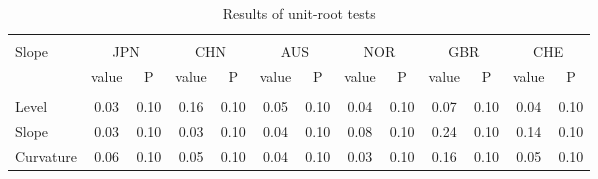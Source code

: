 \documentclass[12pt,bibliography=totoc]{article}
\begin{document}
\begin{appendices}
\begin{table}
\begin{subtable}[t]{1\textwidth}
\begin{tabular}{l cc cc cc cc cc cc}
\hline   \\ [-1.5ex]    

Slope	&	\multicolumn{2}{c}{JPN}			&	\multicolumn{2}{c}{CHN}			&	\multicolumn{2}{c}{AUS}			&	\multicolumn{2}{c}{NOR}			&	\multicolumn{2}{c}{GBR}			&	\multicolumn{2}{c}{CHE}			\\

 & value &P & value &P& value &P & value &P& value &P & value &P\\

\hline       \\ [-1.5ex] 

Level	&	0.03	&	0.10	&	0.16	&	0.10	&	0.05	&	0.10	&	0.04	&	0.10	&	0.07	&	0.10	&	0.04	&	0.10	\\
Slope	&	0.03	&	0.10	&	0.03	&	0.10	&	0.04	&	0.10	&	0.08	&	0.10	&	0.24	&	0.10	&	0.14	&	0.10	\\
Curvature	&	0.06	&	0.10	&	0.05	&	0.10	&	0.04	&	0.10	&	0.03	&	0.10	&	0.16	&	0.10	&	0.05	&	0.10	\\


\hline
\end{tabular}
\caption{\textbf{KPSS(1) test results}}
\end{subtable}
\hspace{\fill}
\caption{Results of unit-root tests}
\end{table}




\end{appendices}
\end{document}
